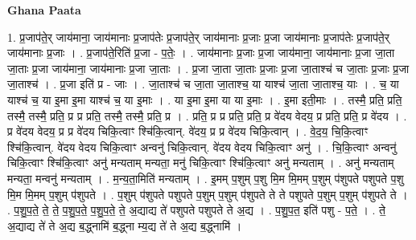 \documentclass[17pt]{extarticle}
\begin{document}
\textbf{Ghana Paata } \newline

1. प्र॒जाप॑ते॒र् जाय॑माना॒ जाय॑मानाः प्र॒जाप॑तेः प्र॒जाप॑ते॒र् जाय॑मानाः प्र॒जाः प्र॒जा जाय॑मानाः प्र॒जाप॑तेः प्र॒जाप॑ते॒र् जाय॑मानाः प्र॒जाः । . प्र॒जाप॑ते॒रिति॑ प्र॒जा - प॒तेः॒ । . जाय॑मानाः प्र॒जाः प्र॒जा जाय॑माना॒ जाय॑मानाः प्र॒जा जा॒ता जा॒ताः प्र॒जा जाय॑माना॒ जाय॑मानाः प्र॒जा जा॒ताः । . प्र॒जा जा॒ता जा॒ताः प्र॒जाः प्र॒जा जा॒ताश्च॑ च जा॒ताः प्र॒जाः प्र॒जा जा॒ताश्च॑ । . प्र॒जा इति॑ प्र - जाः । . जा॒ताश्च॑ च जा॒ता जा॒ताश्च॒ या याश्च॑ जा॒ता जा॒ताश्च॒ याः । . च॒ या याश्च॑ च॒ या इ॒मा इ॒मा याश्च॑ च॒ या इ॒माः । . या इ॒मा इ॒मा या या इ॒माः । . इ॒मा इती॒माः । . तस्मै॒ प्रति॒ प्रति॒ तस्मै॒ तस्मै॒ प्रति॒ प्र प्र प्रति॒ तस्मै॒ तस्मै॒ प्रति॒ प्र । . प्रति॒ प्र प्र प्रति॒ प्रति॒ प्र वे॑दय वेदय॒ प्र प्रति॒ प्रति॒ प्र वे॑दय । . प्र वे॑दय वेदय॒ प्र प्र वे॑दय चिकि॒त्वाꣳ श्चि॑कि॒त्वान्. वे॑दय॒ प्र प्र वे॑दय चिकि॒त्वान् । . वे॒द॒य॒ चि॒कि॒त्वाꣳ श्चि॑कि॒त्वान्. वे॑दय वेदय चिकि॒त्वाꣳ अन्वनु॑ चिकि॒त्वान्. वे॑दय वेदय चिकि॒त्वाꣳ अनु॑ । . चि॒कि॒त्वाꣳ अन्वनु॑ चिकि॒त्वाꣳ श्चि॑कि॒त्वाꣳ अनु॑ मन्यताम् मन्यता॒ मनु॑ चिकि॒त्वाꣳ श्चि॑कि॒त्वाꣳ अनु॑ मन्यताम् । . अनु॑ मन्यताम् मन्यता॒ मन्वनु॑ मन्यताम् । . म॒न्य॒ता॒मिति॑ मन्यताम् । . इ॒मम् प॒शुम् प॒शु मि॒म मि॒मम् प॒शुम् प॑शुपते पशुपते प॒शु मि॒म मि॒मम् प॒शुम् प॑शुपते । . प॒शुम् प॑शुपते पशुपते प॒शुम् प॒शुम् प॑शुपते ते ते पशुपते प॒शुम् प॒शुम् प॑शुपते ते । . प॒शु॒प॒ते॒ ते॒ ते॒ प॒शु॒प॒ते॒ प॒शु॒प॒ते॒ ते॒ अ॒द्याद्य ते॑ पशुपते पशुपते ते अ॒द्य । . प॒शु॒प॒त॒ इति॑ पशु - प॒ते॒ । . ते॒ अ॒द्याद्य ते॑ ते अ॒द्य ब॒द्ध्नामि॑ ब॒द्ध्ना म्य॒द्य ते॑ ते अ॒द्य ब॒द्ध्नामि॑ । \newline
\end{document}
